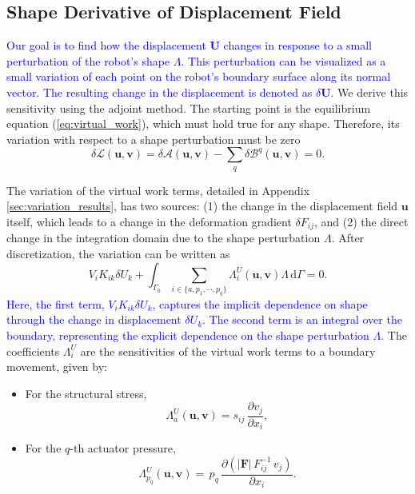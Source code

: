 \documentclass[journal]{IEEEtran}
\theoremstyle{definition}
\begin{document}
\subsection{Shape Derivative of Displacement Field}
\label{sec:sensitivity:displacement}

\textcolor{blue}{Our goal is to find how the displacement $\mathbf{U}$ changes in response to a small perturbation of the robot's shape $\Lambda$. This perturbation can be visualized as a small variation of each point on the robot's boundary surface along its normal vector. The resulting change in the displacement is denoted as $\delta \mathbf{U}$.} We derive this sensitivity using the adjoint method. The starting point is the equilibrium equation (\ref{eq:virtual_work}), which must hold true for any shape. Therefore, its variation with respect to a shape perturbation must be zero
\begin{equation}
  \delta \mathcal{L} \left(\mathbf{u}, \mathbf{v}\right) = \delta \mathcal{A}\left(\mathbf{u}, \mathbf{v}\right) - \sum_q \delta \mathcal{B}^q\left(\mathbf{u}, \mathbf{v}\right) = 0.
  \label{eq:variation_virtual_work}
\end{equation}

The variation of the virtual work terms, detailed in Appendix \ref{sec:variation_results}, has two sources: (1) the change in the displacement field $\mathbf{u}$ itself, which leads to a change in the deformation gradient $\delta F_{ij}$, and (2) the direct change in the integration domain due to the shape perturbation $\Lambda$. After discretization, the variation can be written as
\begin{equation}
  V_i K_{ik} \delta U_k
  +  \int_{\Gamma_0} \sum_{i\in\{a,p_1,\cdots,p_q\}} \Lambda_i^U\left(\mathbf{u},\mathbf{v}\right) \Lambda \,\mathrm{d}\Gamma = 0.
  \label{eq:discreted_variation_1st_virtual_work}
\end{equation}
\textcolor{blue}{Here, the first term, $V_i K_{ik} \delta U_k$, captures the implicit dependence on shape through the change in displacement $\delta U_k$. The second term is an integral over the boundary, representing the explicit dependence on the shape perturbation $\Lambda$.} The coefficients $\Lambda_i^U$ are the sensitivities of the virtual work terms to a boundary movement, given by:
\begin{itemize}
  \item For the structural stress,
    \begin{equation}
      \Lambda_a^U(\mathbf{u},\mathbf{v}) = s_{ij}\,\frac{\partial v_j}{\partial x_i},
    \end{equation}
  \item For the $q$-th actuator pressure,
    \begin{equation}
      \Lambda_{p_q}^U(\mathbf{u},\mathbf{v}) = \,p_q\,\frac{\partial\left(\left|\mathbf{F}\right|\,F^{-1}_{ij}\,v_j\right)}{\partial x_i}.
    \end{equation}
\end{itemize}
\end{document}
